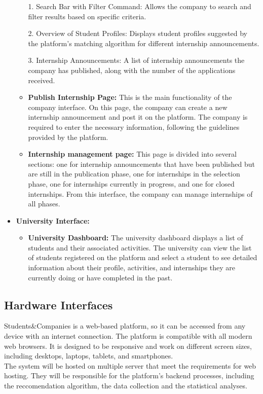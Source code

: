 \begin{itemize}
\begin{itemize}
        1. Search Bar with Filter Command: Allows the company to search and filter results based on specific criteria.
        
        2. Overview of Student Profiles: Displays student profiles suggested by the platform's matching algorithm for different internship 
        announcements.
        
        3. Internship Announcements: A list of internship announcements the company has published, along with the number of the applications
        received.
        
       \item \textbf{Publish Internship Page:} This is the main functionality of the company interface. On this page, the company can 
       create a new internship announcement and post it on the platform. The company is required to enter the necessary information, 
       following the guidelines provided by the platform.

        \item \textbf{Internship management page:} This page is divided into several sections: one for internship announcements that have 
        been published but are still in the publication phase, one for internships in the selection phase, one for internships currently 
        in progress, and one for closed internships. From this interface, the company can manage internships of all phases.
    \end{itemize}

    \item \textbf{University Interface:} 
    \begin{itemize}
        \item \textbf{University Dashboard:} The university dashboard displays a list of students and their associated activities. 
        The university can view the list of students registered on the platform and select a student to see detailed information about 
        their profile, activities, and internships they are currently doing or have completed in the past.
    \end{itemize}
\end{itemize}


\subsection{Hardware Interfaces}
Students\&Companies is a web-based platform, so it can be accessed from any device with an internet connection. The platform is
compatible with all modern web browsers. It is designed to be responsive and work on different screen sizes, including desktops, 
laptops, tablets, and smartphones. \\
The system will be hosted on multiple server that meet the requirements for web hosting. They will be responsible for the platform's 
backend processes, including the reccomendation algorithm, the data collection and the statistical analyses.


